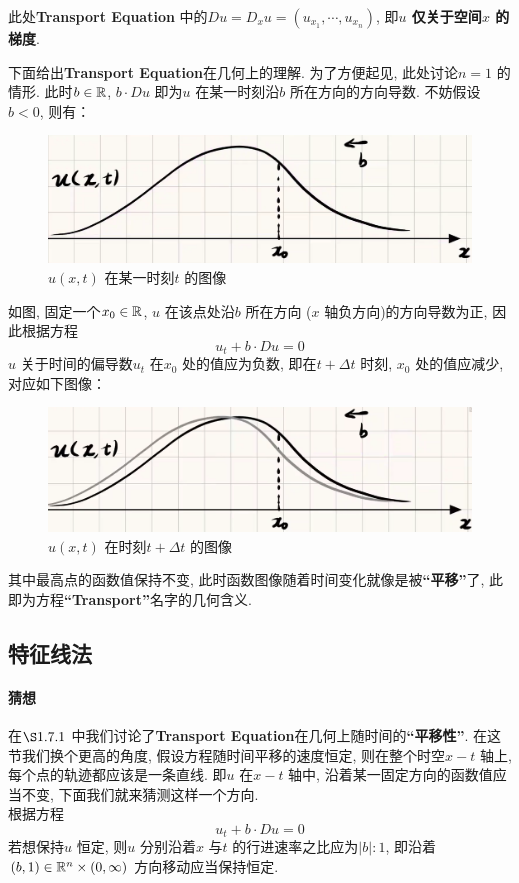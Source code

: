 	\vspace*{2em}
	
	\begin{rmk}
		此处\textbf{Transport Equation} 中的$Du = D_{x}u = (u_{x_1} , \cdots , u_{x_n})$, 即\textbf{$u$ 仅关于空间$x$ 的梯度}.
	\end{rmk}
	
	\vspace*{4em}
	
	下面给出\textbf{Transport Equation}在几何上的理解. 为了方便起见, 此处讨论$n = 1$ 的情形. 此时$b \in \mathbb{R}$, $b \cdot Du$ 即为$u$ 在某一时刻沿$b$ 所在方向的方向导数. 不妨假设$b < 0$, 则有：
	
	\begin{figure}[thbp!]
		\centering
		\includegraphics[width=0.5\linewidth]{figure/1.7.1-1}
		\caption{$u(x , t)$ 在某一时刻$t$ 的图像}
		\label{pic : 1.7.1-1} %
	\end{figure}
	
	如图, 固定一个$x_0 \in \mathbb{R}$, $u$ 在该点处沿$b$ 所在方向 ($x$ 轴负方向)的方向导数为正, 因此根据方程
	\[ u_t + b \cdot Du = 0 \]
	$u$ 关于时间的偏导数$u_t$ 在$x_0$ 处的值应为负数, 即在$t + \Delta t$ 时刻, $x_0$ 处的值应减少, 对应如下图像：
	
	\begin{figure}[thbp!]
		\centering
		\includegraphics[width=0.5\linewidth]{figure/1.7.1-2}
		\caption{$u(x , t)$ 在时刻$t + \Delta t$ 的图像}
		\label{pic : 1.7.1-2} %
	\end{figure}
	
	其中最高点的函数值保持不变, 此时函数图像随着时间变化就像是被\textbf{“平移”}了, 此即为方程\textbf{“Transport”}名字的几何含义.
	
\newpage

\subsection{特征线法}
\paragraph{猜想}
	在$\S 1.7.1$ 中我们讨论了\textbf{Transport Equation}在几何上随时间的\textbf{“平移性”}. 在这节我们换个更高的角度, 假设方程随时间平移的速度恒定, 则在整个时空$x-t$ 轴上, 每个点的轨迹都应该是一条直线. 即$u$ 在$x-t$ 轴中, 沿着某一固定方向的函数值应当不变, 下面我们就来猜测这样一个方向. \\
	根据方程
	\[ u_t + b \cdot Du = 0 \]
	若想保持$u$ 恒定, 则$u$ 分别沿着$x$ 与$t$ 的行进速率之比应为$\left| b \right| : 1$, 即沿着$(b , 1) \in \mathbb{R}^n \times (0 , \infty)$ 方向移动应当保持恒定. 
	
